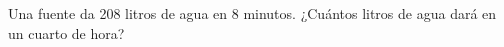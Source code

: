 \documentclass[addpoints,spanish, 12pt,a4paper]{exam}
\renewcommand*\half{.5}
\begin{document}
\begin{questions}


    
    


\question[1\half] Una fuente da 208 litros de agua en 8 minutos. ¿Cuántos litros de agua dará en un cuarto de hora?\vspace{120pt}











\end{questions}
\end{document}
